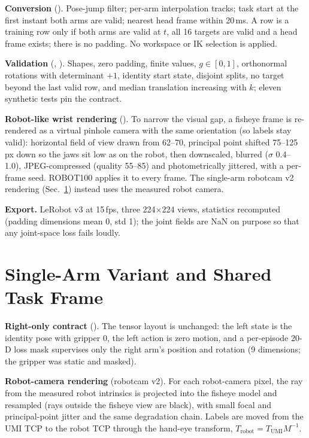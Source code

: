 \documentclass[conference,10pt]{IEEEtran}
\begin{document}
\textbf{Conversion} (). Pose-jump filter; per-arm interpolation tracks; task start at the first instant both arms
are valid; nearest head frame within 20\,ms. A row is a training row only if both arms are valid at $t$, all 16 targets are valid
and a head frame exists; there is no padding. No workspace or IK selection is applied.

\textbf{Validation} (, ). Shapes, zero padding, finite values, $g\in[0,1]$, orthonormal rotations with
determinant $+1$, identity start state, disjoint splits, no target beyond the last valid row, and median translation increasing with
$k$; eleven synthetic tests pin the contract.

\textbf{Robot-like wrist rendering} (). To narrow the visual gap, a fisheye frame is
re-rendered as a virtual pinhole camera with the same orientation (so labels stay valid): horizontal field of view drawn from
62--70\textdegree, principal point shifted 75--125\,px down so the jaws sit low as on the robot, then downscaled, blurred
($\sigma$ 0.4--1.0), JPEG-compressed (quality 55--85) and photometrically jittered, with a per-frame seed. ROBOT100 applies it to
every frame. The single-arm robotcam v2 rendering (Sec.~\ref{sec:hra}) instead uses the measured robot camera.

\textbf{Export.} LeRobot v3 at 15\,fps, three 224$\times$224 views, statistics recomputed (padding dimensions mean 0, std 1); the
joint fields are NaN on purpose so that any joint-space loss fails loudly.

\section{Single-Arm Variant and Shared Task Frame}\label{sec:hra}
\textbf{Right-only contract} (). The tensor layout is unchanged: the left state is the identity pose with
gripper 0, the left action is zero motion, and a per-episode 20-D loss mask supervises only the right arm's position and rotation
(9 dimensions; the gripper was static and masked).

\textbf{Robot-camera rendering} (robotcam v2). For each robot-camera pixel, the ray from the measured robot intrinsics is projected
into the fisheye model and resampled (rays outside the fisheye view are black), with small focal and principal-point jitter and the
same degradation chain. Labels are moved from the UMI TCP to the robot TCP through the hand-eye transform, $T_\text{robot}=T_\text{UMI}M^{-1}$.
\end{document}
